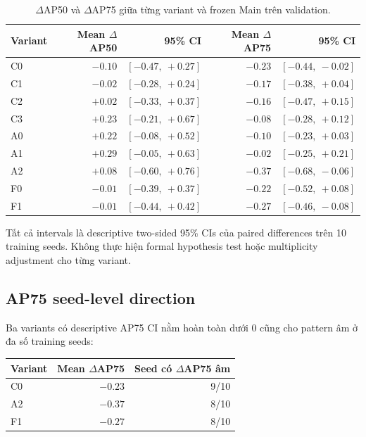 \documentclass[pdflatex,sn-mathphys-num]{sn-jnl}%
\theoremstyle{thmstyleone}%
\theoremstyle{thmstyletwo}%
\theoremstyle{thmstylethree}%
\begin{document}
\begin{table}[htbp]
\centering
\caption{$\Delta$AP50 và $\Delta$AP75 giữa từng variant và frozen Main trên validation.}
\label{tab:supp_ablation_ap50_ap75}
\small
\begin{tabular}{lrrrr}
\toprule
\textbf{Variant} & \textbf{Mean $\Delta$AP50} & \textbf{95\% CI} &
\textbf{Mean $\Delta$AP75} & \textbf{95\% CI}\\
\midrule
C0 & $-0.10$ & $[-0.47,\ +0.27]$ & $-0.23$ & $[-0.44,\ -0.02]$\\
C1 & $-0.02$ & $[-0.28,\ +0.24]$ & $-0.17$ & $[-0.38,\ +0.04]$\\
C2 & $+0.02$ & $[-0.33,\ +0.37]$ & $-0.16$ & $[-0.47,\ +0.15]$\\
C3 & $+0.23$ & $[-0.21,\ +0.67]$ & $-0.08$ & $[-0.28,\ +0.12]$\\
A0 & $+0.22$ & $[-0.08,\ +0.52]$ & $-0.10$ & $[-0.23,\ +0.03]$\\
A1 & $+0.29$ & $[-0.05,\ +0.63]$ & $-0.02$ & $[-0.25,\ +0.21]$\\
A2 & $+0.08$ & $[-0.60,\ +0.76]$ & $-0.37$ & $[-0.68,\ -0.06]$\\
F0 & $-0.01$ & $[-0.39,\ +0.37]$ & $-0.22$ & $[-0.52,\ +0.08]$\\
F1 & $-0.01$ & $[-0.44,\ +0.42]$ & $-0.27$ & $[-0.46,\ -0.08]$\\
\bottomrule
\end{tabular}
\end{table}

Tất cả intervals là descriptive two-sided 95\% CIs của paired differences trên 10 training seeds. Không thực hiện formal hypothesis test hoặc multiplicity adjustment cho từng variant.

\subsection{AP75 seed-level direction}

Ba variants có descriptive AP75 CI nằm hoàn toàn dưới 0 cũng cho pattern âm ở đa số training seeds:
\begin{center}
\begin{tabular}{lrr}
\toprule
\textbf{Variant} & \textbf{Mean $\Delta$AP75} & \textbf{Seed có $\Delta$AP75 âm}\\
\midrule
C0 & $-0.23$ & 9/10\\
A2 & $-0.37$ & 8/10\\
F1 & $-0.27$ & 8/10\\
\bottomrule
\end{tabular}
\end{center}
\end{document}
